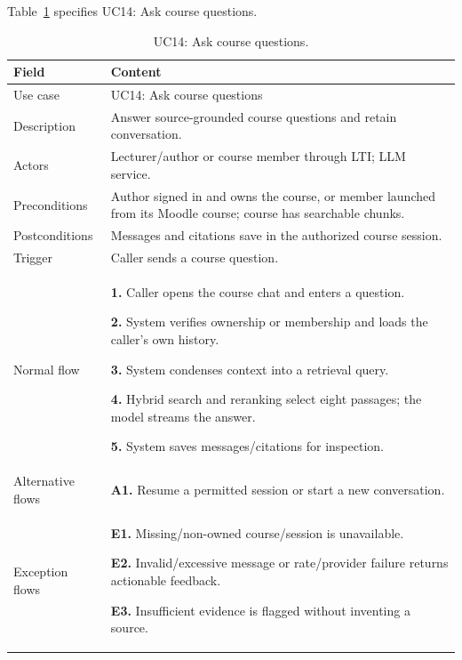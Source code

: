 \needspace{.39\textheight}
Table~\ref{tab:uc-14} specifies UC14: Ask course questions.
\begin{table}[H]\centering\footnotesize{}\renewcommand{\arraystretch}{1.05}
\caption{UC14: Ask course questions.}\label{tab:uc-14}
\begin{tabular}{|p{2.8cm}|p{11.9cm}|}\hline
\textbf{Field} & \textbf{Content}\\\hline
Use case & UC14: Ask course questions\\\hline
Description & Answer source-grounded course questions and retain conversation.\\\hline
Actors & Lecturer/author or course member through LTI; LLM service.\\\hline
Preconditions & Author signed in and owns the course, or member launched from its Moodle course; course has searchable chunks.\\\hline
Postconditions & Messages and citations save in the authorized course session.\\\hline
Trigger & Caller sends a course question.\\\hline
Normal flow & \textbf{1.} Caller opens the course chat and enters a question.\par \textbf{2.} System verifies ownership or membership and loads the caller's own history.\par \textbf{3.} System condenses context into a retrieval query.\par \textbf{4.} Hybrid search and reranking select eight passages; the model streams the answer.\par \textbf{5.} System saves messages/citations for inspection.\\\hline
Alternative flows & \textbf{A1.} Resume a permitted session or start a new conversation.\\\hline
Exception flows & \textbf{E1.} Missing/non-owned course/session is unavailable.\par \textbf{E2.} Invalid/excessive message or rate/provider failure returns actionable feedback.\par \textbf{E3.} Insufficient evidence is flagged without inventing a source.\\\hline
\end{tabular}\end{table}
